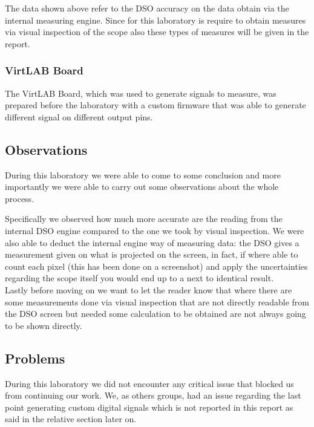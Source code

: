 \documentclass[../main.tex]{subfiles}
\begin{document}
The data shown above refer to the DSO accuracy on the data obtain via the internal measuring engine. Since for this laboratory is require to obtain measures via visual inspection of the scope also these types of measures will be given in the report.

\subsubsection*{VirtLAB Board}

The VirtLAB Board, which was used to generate signals to measure, was prepared before the laboratory with a custom firmware that was able to generate different signal on different output pins.

\subsection*{Observations}

During this laboratory we were able to come to some conclusion and more importantly we were able to carry out some observations about the whole process.

Specifically we observed how much more accurate are the reading from the internal DSO engine compared to the one we took by visual inspection. We were also able to deduct the internal engine way of measuring data: the DSO gives a measurement given on what is projected on the screen, in fact, if where able to count each pixel (this has been done on a screenshot) and apply the uncertainties regarding the scope itself you would end up to a next to identical result.\\

Lastly before moving on we want to let the reader know that where there are some measurements done via visual inspection that are not directly readable from the DSO screen but needed some calculation to be obtained are not always going to be shown directly.

\subsection*{Problems}

During this laboratory we did not encounter any critical issue that blocked us from continuing our work. We, as others groups, had an issue regarding the last point generating custom digital signals which is not reported in this report as said in the relative section later on.\\
\end{document}

